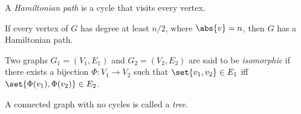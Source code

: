 \begin{definition*} \label{def:graph:hamiltonian}
    A \emph{Hamiltonian path} is a cycle that visits every vertex.
\end{definition*}
\begin{fact*} \label{thm:graph:dirac}
    If every vertex of $G$ has degree at least $n/2$, where $\abs{v} = n$,
    then $G$ has a Hamiltonian path.
\end{fact*}

\begin{definition} \label{def:graph:isomorphism}
    Two graphs $G_1 = (V_1, E_1)$ and $G_2 = (V_2, E_2)$ are said to be
    \emph{isomorphic} if there exists a bijection $\Phi\colon V_1 \to V_2$
    such that $\set{v_1, v_2} \in E_1$ iff
    $\set{\Phi(v_1), \Phi(v_2)} \in E_2$.
\end{definition}

\begin{definition}[Tree] \label{def:tree}
    A connected graph with no cycles is called a \emph{tree}.
\end{definition}

